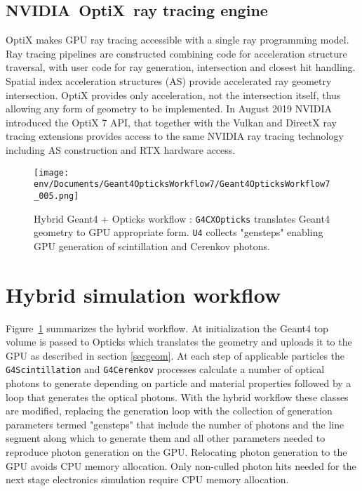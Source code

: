 \documentclass{webofc}
\begin{document}
\subsection{NVIDIA\textregistered\ OptiX\texttrademark\ ray tracing engine}
%
OptiX makes GPU ray tracing accessible with a single ray programming model.
Ray tracing pipelines are constructed combining code for acceleration structure traversal, 
with user code for ray generation, intersection and closest hit handling.
Spatial index acceleration structures (AS) provide accelerated ray geometry intersection. 
OptiX provides only acceleration, not the intersection itself, thus allowing any form of geometry 
to be implemented. 
%
In August 2019 NVIDIA introduced the OptiX 7 API\cite{optix7},
that together with the Vulkan and DirectX ray tracing extensions provides access 
to the same NVIDIA ray tracing technology including AS construction and RTX hardware access. 
%
%
%
%
\begin{figure}[t]
\centering
\texttt{[image: env/Documents/Geant4OpticksWorkflow7/Geant4OpticksWorkflow7\_005.png]}
\caption{Hybrid Geant4 + Opticks workflow : {\tt G4CXOpticks} translates Geant4 geometry to GPU appropriate form. 
{\tt U4} collects "gensteps" enabling GPU generation of scintillation and Cerenkov photons.
}
\label{workflow} 
\end{figure}
%
\section{Hybrid simulation workflow}%
\label{secworkflow}%
%
Figure~\ref{workflow} summarizes the hybrid workflow. 
At initialization the Geant4 top volume is passed to Opticks
which translates the geometry and uploads it to the GPU as described in section \ref{secgeom}.
%
At each step of applicable particles the {\tt G4Scintillation} and {\tt G4Cerenkov} 
processes calculate a number of optical photons to generate depending on particle and material properties 
followed by a loop that generates the optical photons. With the hybrid workflow 
these classes are modified, replacing the generation loop with the collection of generation parameters termed "gensteps" 
that include the number of photons and the line segment along which to generate them and all
other parameters needed to reproduce photon generation on the GPU. Relocating photon generation to the
GPU avoids CPU memory allocation. Only non-culled photon hits needed for the next stage electronics 
simulation require CPU memory allocation. 
\end{document}
